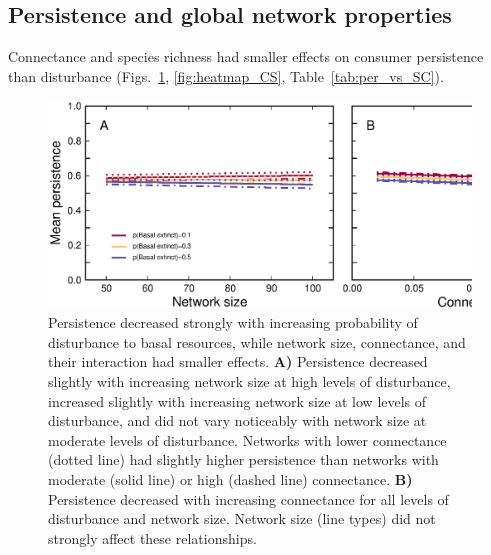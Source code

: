 \documentclass[12pt]{article}
\begin{document}
\begin{spacing}{2.0}
            

\section{Persistence and global network properties}

    Connectance and species richness had smaller effects on consumer persistence than disturbance (Figs.~\ref{fig:lm_CS}, \ref{fig:heatmap_CS}, Table~\ref{tab:per_vs_SC}).

    \begin{figure}[hb!]
        \centering
        \includegraphics[width=\textwidth]{figures/persistence_vs_SC_lm.eps}
        \caption{Persistence decreased strongly with increasing probability of disturbance to basal resources, while network size, connectance, and their interaction had smaller effects. \textbf{A)} Persistence decreased slightly with increasing network size at high levels of disturbance, increased slightly with increasing network size at low levels of disturbance, and did not vary noticeably with network size at moderate levels of disturbance. Networks with lower connectance (dotted line) had slightly higher persistence than networks with moderate (solid line) or high (dashed line) connectance.
        \textbf{B)} Persistence decreased with increasing connectance for all levels of disturbance and network size. Network size (line types) did not strongly affect these relationships.}
        \label{fig:lm_CS}
    \end{figure}




\end{spacing}
\end{document}
